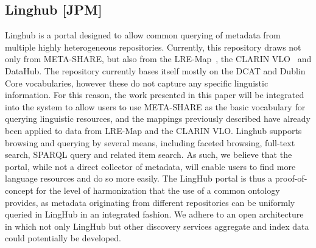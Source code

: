 \documentclass{llncs}
\begin{document}
{\subsection{Linghub [JPM]}

Linghub is a portal designed to allow common querying of metadata from multiple
highly heterogeneous repositories. Currently, this repository draws not only
from META-SHARE, but also from the LRE-Map~\cite{calzolari2012lre}, the CLARIN
VLO~\cite{broeder2010data} and DataHub. The repository currently bases itself
mostly on the DCAT and Dublin Core vocabularies, however these do not capture
any specific linguistic information. For this reason, the work presented in this
paper will be integrated into the system to allow users to use META-SHARE as the
basic vocabulary for querying linguistic resources, and the mappings previously
described have already been applied to data from LRE-Map and the CLARIN VLO.
Linghub supports browsing and querying by several means, including faceted
browsing, full-text search, SPARQL query and related item search. As such, we
believe that the portal, while not a direct collector of metadata, will enable
users to find more language resources and do so more easily.
The LingHub portal is thus a proof-of-concept for the level of
harmonization that the use of a common ontology provides, as metadata
originating from different repositories can be uniformly queried in LingHub in
an integrated fashion. We adhere to an open architecture in which not only
LingHub but other discovery services aggregate and index data could potentially
be developed.


}
\end{document}
